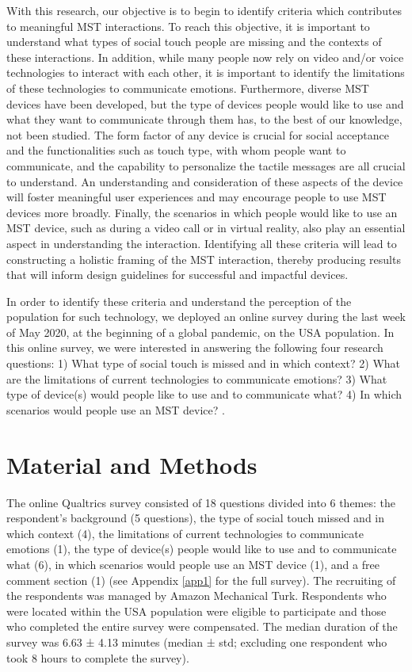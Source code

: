 \documentclass[acmsmall]{acmart}
\begin{document}
With this research, our objective is to begin to identify criteria which contributes to meaningful MST interactions. To reach this objective, it is important to understand what types of social touch people are missing and the contexts of these interactions. In addition, while many people now rely on video and/or voice technologies to interact with each other, it is important to identify the limitations of these technologies to communicate emotions. Furthermore, diverse MST devices have been developed, but the type of devices people would like to use and what they want to communicate through them has, to the best of our knowledge, not been studied. The form factor of any device is crucial for social acceptance and the functionalities such as touch type, with whom people want to communicate, and the capability to personalize the tactile messages are all crucial to understand. An understanding and consideration of these aspects of the device will foster meaningful user experiences and may encourage people to use MST devices more broadly. Finally, the scenarios in which people would like to use an MST device, such as during a video call or in virtual reality, also play an essential aspect in understanding the interaction. Identifying all these criteria will lead to constructing a holistic framing of the MST interaction, thereby producing results that will inform design guidelines for successful and impactful devices.

In order to identify these criteria and understand the perception of the population for such technology, we deployed an online survey during the last week of May 2020, at the beginning of a global pandemic, on the USA population. In this online survey, we were interested in answering the following four research questions: 1) What type of social touch is missed and in which context? 2) What are the limitations of current technologies to communicate emotions? 3) What type of device(s) would people like to use and to communicate what? 4) In which scenarios would people use an MST device? .

\section{Material and Methods}
The online Qualtrics survey consisted of 18 questions divided into 6 themes: the respondent’s background (5 questions), the type of social touch missed and in which context (4), the limitations of current technologies to communicate emotions (1), the type of device(s) people would like to use and to communicate what (6), in which scenarios would people use an MST device (1), and a free comment section (1) (see Appendix \ref{app1} for the full survey). The recruiting of the respondents was managed by Amazon Mechanical Turk. Respondents who were located within the USA population were eligible to participate and those who completed the entire survey were compensated. The median duration of the survey was 6.63 ± 4.13 minutes (median ± std; excluding one respondent who took 8 hours to complete the survey).
\end{document}
